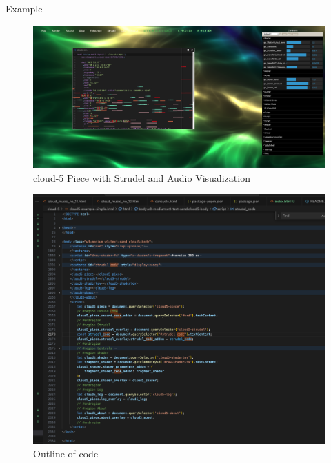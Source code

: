 \documentclass{beamer}
\begin{document}
\begin{frame}{Example}
\begin{figure}
\centering
\includegraphics[width=0.90\linewidth]{cloud5}
\caption{cloud-5 Piece with Strudel and Audio Visualization}
\label{fig:cloud5}
\end{figure}
\end{frame}

\begin{frame}{}
\begin{figure}
\centering
\includegraphics[height=0.85\textheight]{cloud5-code}
\caption{Outline of code}
\label{fig:cloud5-code}
\end{figure}
\end{frame}
\end{document}
